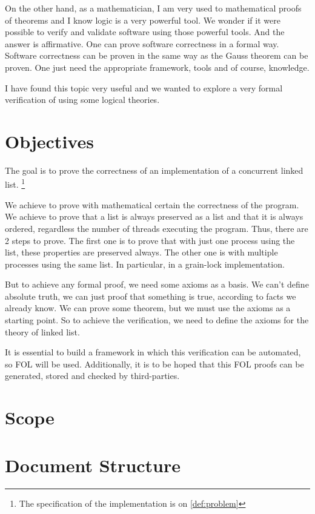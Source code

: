 On the other hand, as a mathematician, I am very used to mathematical proofs of theorems and I know logic is a very powerful tool.
%
We wonder if it were possible to verify and validate software using those powerful tools.
%
And the answer is affirmative.
%
One can prove software correctness in a formal way.
% 
Software correctness can be proven in the same way as the Gauss theorem can be proven.
%
One just need the appropriate framework, tools and of course, knowledge.


I have found this topic very useful and we wanted to explore a very formal verification of using some logical theories.


\section{Objectives}

The goal is to prove the correctness of an implementation of a concurrent linked list. \footnote{The specification of the implementation is on \ref{def:problem}}

We achieve to prove with mathematical certain the correctness of the program. 
%
We achieve to prove that a list is always preserved as a list and that it is always ordered, regardless the number of threads executing the program.
%
Thus, there are 2 steps to prove. 
%
The first one is to prove that with just one process using the list, these properties are preserved always. 
%
The other one is with multiple processes using the same list. 
%
In particular, in a grain-lock implementation.

But to achieve any formal proof, we need some axioms as a basis.
%
We can't define absolute truth, we can just proof that something is true, according to facts we already know. 
%
We can prove some theorem, but we must use the axioms as a starting point. 
%
So to achieve the verification, we need to define the axioms for the theory of linked list.

It is essential to build a framework in which this verification can be automated, so \gls{FOL} will be used. 
%
Additionally, it is to be hoped that this \gls{FOL} proofs can be generated, stored and checked by third-parties.


\section{Scope}



\section{Document Structure}


